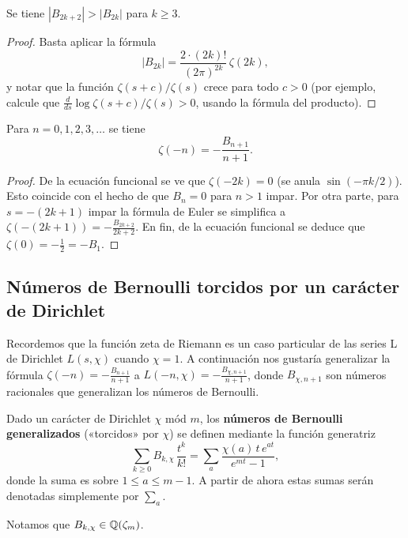 \begin{corolario}
  Se tiene $|B_{2k+2}| > |B_{2k}|$ para $k \ge 3$.

  \begin{proof}
    Basta aplicar la fórmula
    $$|B_{2k}| = \frac{2\cdot (2k)!}{(2\pi)^{2k}}\,\zeta (2k),$$
    y notar que la función $\zeta (s+c)/\zeta (s)$ crece para todo $c > 0$
    (por ejemplo, calcule que $\frac{d}{ds} \log \zeta (s+c)/\zeta (s) > 0$,
    usando la fórmula del producto).
  \end{proof}
\end{corolario}

\begin{corolario}
  Para $n = 0,1,2,3,\ldots$ se tiene
  $$\zeta (-n) = -\frac{B_{n+1}}{n+1}.$$

  \begin{proof}
    De la ecuación funcional se ve que $\zeta (-2k) = 0$ (se anula
    $\sin (-\pi k/2)$). Esto coincide con el hecho de que $B_n = 0$ para $n > 1$
    impar. Por otra parte, para $s = -(2k+1)$ impar la fórmula de Euler se
    simplifica a $\zeta (-(2k+1)) = -\frac{B_{2k+2}}{2k+2}$. En fin, de la
    ecuación funcional se deduce que $\zeta (0) = -\frac{1}{2} = -B_1$.
  \end{proof}
\end{corolario}

\subsection{Números de Bernoulli torcidos por un carácter de Dirichlet}

Recordemos que la función zeta de Riemann es un caso particular de las series L
de Dirichlet $L (s,\chi)$ cuando $\chi = 1$. A continuación nos gustaría
generalizar la fórmula $\zeta (-n) = -\frac{B_{n+1}}{n+1}$ a
$L (-n,\chi) = -\frac{B_{\chi,n+1}}{n+1}$, donde $B_{\chi,n+1}$ son números
racionales que generalizan los números de Bernoulli.

\begin{definicion}
  Dado un carácter de Dirichlet $\chi$ mód $m$, los
  \textbf{números de Bernoulli generalizados} («torcidos» por $\chi$) se definen
  mediante la función generatriz
  $$\sum_{k\ge 0} B_{k,\chi}\,\frac{t^k}{k!} = \sum_a \frac{\chi (a)\,t\,e^{at}}{e^{mt} - 1},$$
  donde la suma es sobre $1 \le a \le m-1$. A partir de ahora estas sumas serán
  denotadas simplemente por $\sum\limits_a$.
\end{definicion}

Notamos que $B_{k,\chi} \in \mathbb{Q} (\zeta_m)$.


